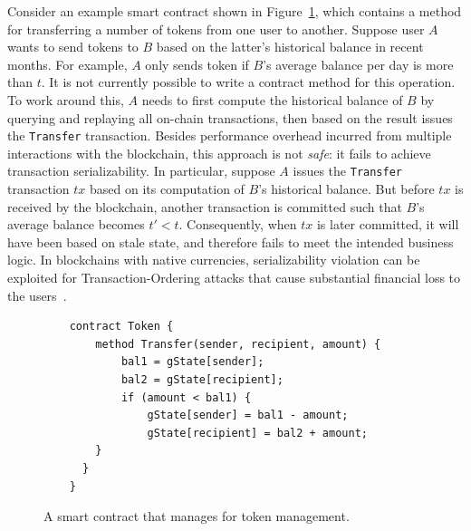 Consider an example smart contract shown in Figure~\ref{prov:code:contract}, which contains a method for transferring a
number of tokens from one user to another. Suppose user $A$ wants to send tokens to $B$ based on the latter's
historical balance in recent months. For example, $A$ only sends token if $B$'s average balance per day is
more than $t$. It is not currently possible to write a contract method for this operation. To work around
this, $A$ needs to first compute the historical balance of $B$ by querying and replaying all on-chain
transactions, then based on the result issues the \texttt{Transfer} transaction. Besides performance
overhead incurred from multiple interactions with the blockchain, this approach is not {\em safe}: it fails to
achieve transaction serializability. In particular, suppose $A$ issues the \texttt{Transfer} transaction
$tx$ based on its computation of $B$'s historical balance. But before $tx$ is received by the
blockchain, another transaction is committed such that $B$'s average balance becomes $t' < t$. Consequently,
when $tx$ is later committed, it will have been based on stale state, and therefore fails to meet the intended
business logic. In blockchains with native currencies, serializability violation can be exploited for
Transaction-Ordering attacks that cause substantial financial loss to the users~\cite{luu2016making}.

\begin{figure}
    \footnotesize
    \centering
    \begin{verbatim}
    contract Token {
        method Transfer(sender, recipient, amount) {
            bal1 = gState[sender];
            bal2 = gState[recipient];
            if (amount < bal1) {
                gState[sender] = bal1 - amount;
                gState[recipient] = bal2 + amount;
        } 
      } 
    }
    \end{verbatim}
\caption{A smart contract that manages for token management.}
\label{prov:code:contract}
\end{figure}

